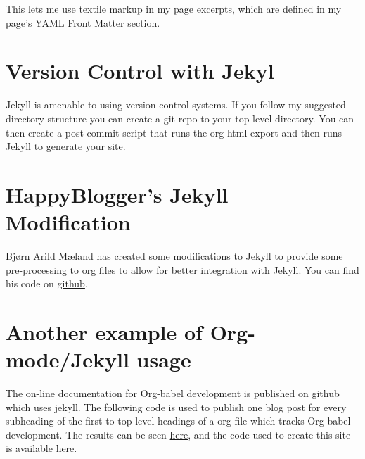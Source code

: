 \documentclass{article}
\begin{document}
This lets me use textile markup in my page excerpts, which are defined
in my page's YAML Front Matter section.
\section{Version Control with Jekyl}
\label{sec-9}


Jekyll is amenable to using version control systems. If you follow my
suggested directory structure you can create a git repo to your top
level directory. You can then create a post-commit script that runs the
org html export and then runs Jekyll to generate your site.
\section{HappyBlogger's Jekyll Modification}
\label{sec-10}


Bjørn Arild Mæland has created some modifications to Jekyll to provide
some pre-processing to org files to allow for better integration with
Jekyll. You can find his code on
\href{http://github.com/bmaland/happyblogger}{github}.
\section{Another example of Org-mode/Jekyll usage}
\label{sec-11}


The on-line documentation for
\href{file://.../org-contrib/babel/index.html}{Org-babel} development is published
on \href{http://github.com}{github} which uses jekyll. The following code
is used to publish one blog post for every subheading of the first to
top-level headings of a org file which tracks Org-babel development. The
results can be seen \href{http://eschulte.github.com/babel-dev/}{here}, and
the code used to create this site is available
\href{http://github.com/eschulte/babel-dev/}{here}.
\end{document}
